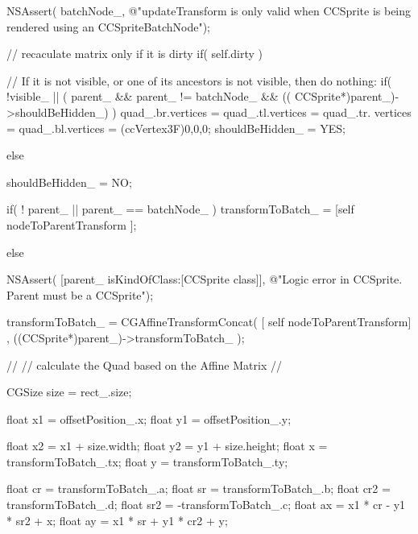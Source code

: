 \begin{DoxyCode}
{
        NSAssert( batchNode_, @"updateTransform is only valid when CCSprite is
       being rendered using an CCSpriteBatchNode");

        // recaculate matrix only if it is dirty
        if( self.dirty ) {

                // If it is not visible, or one of its ancestors is not
       visible, then do nothing:
                if( !visible_ || ( parent_ && parent_ != batchNode_ && ((
      CCSprite*)parent_)->shouldBeHidden_) ) {
                        quad_.br.vertices = quad_.tl.vertices = quad_.tr.
      vertices = quad_.bl.vertices = (ccVertex3F){0,0,0};
                        shouldBeHidden_ = YES;
                }

                else {

                        shouldBeHidden_ = NO;

                        if( ! parent_ || parent_ == batchNode_ )
                                transformToBatch_ = [self nodeToParentTransform
      ];

                        else {
                                NSAssert( [parent_ isKindOfClass:[CCSprite 
      class]], @"Logic error in CCSprite. Parent must be a CCSprite");

                                transformToBatch_ = CGAffineTransformConcat( [
      self nodeToParentTransform] , ((CCSprite*)parent_)->transformToBatch_ );
                        }

                        //
                        // calculate the Quad based on the Affine Matrix
                        //

                        CGSize size = rect_.size;

                        float x1 = offsetPosition_.x;
                        float y1 = offsetPosition_.y;

                        float x2 = x1 + size.width;
                        float y2 = y1 + size.height;
                        float x = transformToBatch_.tx;
                        float y = transformToBatch_.ty;

                        float cr = transformToBatch_.a;
                        float sr = transformToBatch_.b;
                        float cr2 = transformToBatch_.d;
                        float sr2 = -transformToBatch_.c;
                        float ax = x1 * cr - y1 * sr2 + x;
                        float ay = x1 * sr + y1 * cr2 + y;

}}}
\end{DoxyCode}
